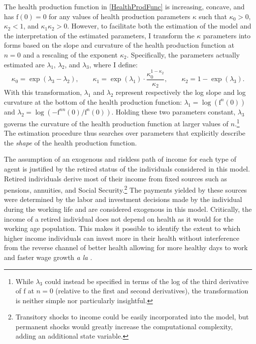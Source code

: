 \documentclass[12pt,pdftex,letterpaper]{article}
\newcommand{\Invst}{n}
\newcommand{\HealthProdFunc}{\text{f}}
\newcommand{\HealthProdParam}{\kappa}
\newcommand{\HealthProdParamAlt}{\lambda}
\begin{document}
The health production function in \eqref{HealthProdFunc} is increasing, concave, and has $\HealthProdFunc(0) = 0$ for any values of health production parameters $\HealthProdParam$ such that $\HealthProdParam_0 > 0$, $\HealthProdParam_2 < 1$, and $\HealthProdParam_1 \HealthProdParam_2 > 0$.  However, to facilitate both the estimation of the model and the interpretation of the estimated parameters, I transform the $\HealthProdParam$ parameters into forms based on the slope and curvature of the health production function at $\Invst=0$ and a rescaling of the exponent $\HealthProdParam_2$.  Specifically, the parameters actually estimated are $\HealthProdParamAlt_1$, $\HealthProdParamAlt_2$, and $\HealthProdParamAlt_3$, where I define:
\begin{equation}\label{HealthProdParamAlt}
\HealthProdParam_0 = \exp(\HealthProdParamAlt_3-\HealthProdParamAlt_2), \qquad \HealthProdParam_1 = \exp(\HealthProdParamAlt_1) \cdot \frac{\HealthProdParam_0^{1-\HealthProdParam_2}}{\HealthProdParam_2}, \qquad \HealthProdParam_2 = 1 - \exp(\HealthProdParamAlt_3).
\end{equation}
With this transformation, $\HealthProdParamAlt_1$ and $\HealthProdParamAlt_2$ represent respectively the log slope and log curvature at the bottom of the health production function:  $\HealthProdParamAlt_1 = \log(\HealthProdFunc^\Invst(0))$ and $\HealthProdParamAlt_2 = \log(-\HealthProdFunc^{\Invst \Invst}(0)/\HealthProdFunc^\Invst(0))$.  Holding these two parameters constant, $\HealthProdParamAlt_3$ governs the curvature of the health production function at larger values of $\Invst$.\footnote{While $\HealthProdParamAlt_3$ could instead be specified in terms of the log of the third derivative of $\HealthProdFunc$ at $\Invst=0$ (relative to the first and second derivatives), the transformation is neither simple nor particularly insightful.}    The estimation procedure thus searches over parameters that explicitly describe the \textit{shape} of the health production function.

The assumption of an exogenous and riskless path of income for each type of agent is justified by the retired status of the individuals considered in this model.  Retired individuals derive most of their income from fixed sources such as pensions, annuities, and Social Security.\footnote{Transitory shocks to income could be easily incorporated into the model, but permanent shocks would greatly increase the computational complexity, adding an additional state variable.}  The payments yielded by these sources were determined by the labor and investment decisions made by the individual during the working life and are considered exogenous in this model.  Critically, the income of a retired individual does not depend on health as it would for the working age population.  This makes it possible to identify the extent to which higher income individuals can invest more in their health without interference from the reverse channel of better health allowing for more healthy days to work and faster wage growth \textit{a la} \cite{grossman72}.
\end{document}
